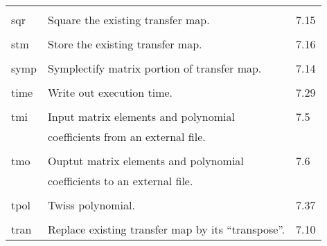 \begin{center}
\begin{tabular}{lll}
\vspace{-3mm}& &\\
\hspace{1.5em}sqr   &        Square the existing transfer map.     & \hspace{2em}7.15\\
\vspace{-3mm}& &\\
\hspace{1.5em}stm   &        Store the existing transfer map.      & \hspace{2em}7.16\\
\vspace{-3mm}& &\\
\hspace{1.5em}symp  & Symplectify matrix portion of transfer map. & \hspace{2em}7.14\\
\vspace{-3mm}& &\\
\hspace{1.5em}time  &         Write out execution time.            & \hspace{2em}7.29\\
\vspace{-3mm}& &\\
\hspace{1.5em}tmi   &        Input matrix elements and polynomial  & \hspace{2em}7.5\\
                    & coefficients from an external file.          &\\
\vspace{-3mm}& &\\
\hspace{1.5em}tmo   &        Ouptut matrix elements and polynomial & \hspace{2em}7.6\\
                    & coefficients to an external file.            &\\
\vspace{-3mm}& &\\
\hspace{1.5em}tpol  & Twiss polynomial.                            & \hspace{2em}7.37\\
\vspace{-3mm}& &\\
\hspace{1.5em}tran  & Replace existing transfer map by its ``transpose''. & \hspace{2em}7.10\\

\end{tabular}
\end{center}
